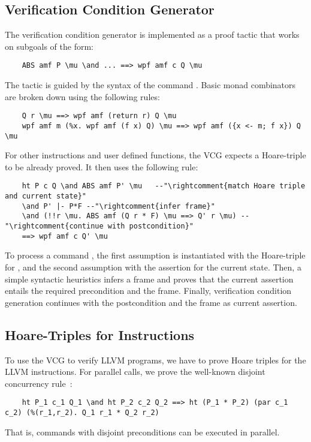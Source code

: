\documentclass[a4paper,UKenglish,cleveref, autoref, thm-restate]{lipics-v2021}
\begin{document}
  \subsection{Verification Condition Generator}
  The verification condition generator is implemented as a proof tactic that works on subgoals of the form:
  \begin{lstlisting}
    ABS amf P \mu \and ... ==> wpf amf c Q \mu
  \end{lstlisting}
  The tactic is guided by the syntax of the command .
  Basic monad combinators are broken down using the following rules:
  \begin{lstlisting}
    Q r \mu ==> wpf amf (return r) Q \mu
    wpf amf m (%x. wpf amf (f x) Q) \mu ==> wpf amf ({x <- m; f x}) Q \mu
  \end{lstlisting}
  For other instructions and user defined functions, the VCG expects a Hoare-triple to be already proved.
  It then uses the following rule:
  \begin{lstlisting}
    ht P c Q \and ABS amf P' \mu   --"\rightcomment{match Hoare triple and current state}"
    \and P' |- P*F --"\rightcomment{infer frame}"
    \and (!!r \mu. ABS amf (Q r * F) \mu ==> Q' r \mu) --"\rightcomment{continue with postcondition}"
    ==> wpf amf c Q' \mu
  \end{lstlisting}
  To process a command , the first assumption is instantiated with the Hoare-triple for ,
  and the second assumption with the assertion  for the current state.
  Then, a simple syntactic heuristics infers a frame  and proves that the
  current assertion  entails the required precondition  and the frame.
  Finally, verification condition generation continues with the postcondition  and the frame as current assertion.


  \subsection{Hoare-Triples for Instructions}
  To use the VCG to verify LLVM programs, we have to prove Hoare triples for the LLVM instructions.
  For parallel calls, we prove the well-known disjoint concurrency rule~\cite{OH04}:
  \begin{lstlisting}
    ht P_1 c_1 Q_1 \and ht P_2 c_2 Q_2 ==> ht (P_1 * P_2) (par c_1 c_2) (%(r_1,r_2). Q_1 r_1 * Q_2 r_2)
  \end{lstlisting}
  That is, commands with disjoint preconditions can be executed in parallel.
\end{document}

